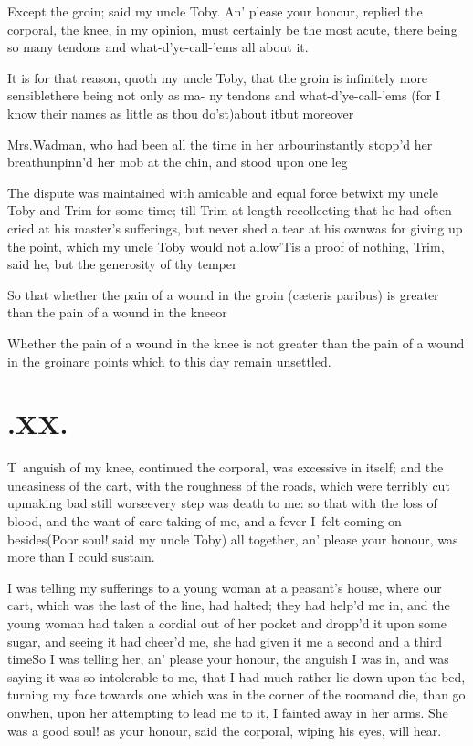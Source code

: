 \documentclass{article}
\begin{document}
Except the groin; said my uncle Toby. An’ please
your honour, replied the corporal, the knee, in my opinion, must
certainly be the most acute, there being so many tendons and
what-d’ye-call-’ems all about it.

It is for that reason, quoth my uncle Toby, that the
groin is infinitely more sensible\tsh there being not only
as ma- ny tendons and what-d’ye-call-’ems (for I know
their names as little as thou do’st)\tsh about
it\tsh but moreover\break {}\tsh

Mrs.\@ Wadman, who had been all the time in her
arbour\tsk instantly stopp’d her\break
breath\tsk unpinn’d her mob at the chin, and stood upon one
leg\tsh

The dispute was maintained with ami\-cable and equal force betwixt
my uncle Toby and Trim for some time; till
Trim at length recollecting that he had often cried at his
master’s sufferings, but never shed a tear at his
own\tsk was for giving up the point, which my uncle Toby
would not allow\tsh ’Tis a proof of nothing,
Trim, said he, but the generosity of thy
temper\tsh{}

So that whether the pain of a wound in the groin (cæteris
paribus) is greater than the pain of a wound in the
knee\tsh or

Whether the pain of a wound in the knee is not greater than the
pain of a wound in the groin\tsh are points which to this
day remain unsettled.

\section{.\enspace XX.}

\lettrine{T}{\,} anguish of my knee, continued the
corporal, was excessive in itself; and the uneasiness of the
cart, with the roughness of the roads, which were terribly cut
up\tsk making bad still worse\tsk every step was death to me: so
that with the loss of blood, and the want of care-taking of
me, and a fever I~felt coming on besides\tsh (Poor soul!\break
said my uncle Toby) all together, an’ please your honour, was
more than I could sustain.

I was telling my sufferings to a young woman at a
peasant’s house, where our cart, which was the last of the
line, had halted; they had help’d me in, and the young woman
had taken a cordial out of her pocket and dropp’d it upon
some sugar, and seeing it had cheer’d me, she had given it me
a second and a third time\tsh So I was telling her,
an’ please your honour, the anguish I was in, and was saying
it was so intolerable to me, that I had much rather lie down upon
the bed, turning my face towards one which was in the corner of the
room\tsk and die, than go on\tsh when, upon her
attempting to lead me to it, I fainted away in her arms. She was a
good soul! as your honour, said the corporal, wiping his eyes, will
hear.
\end{document}
